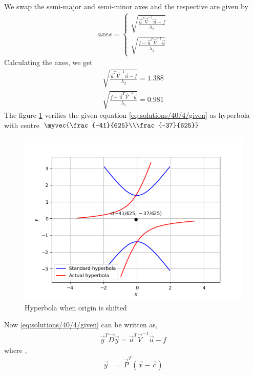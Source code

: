 We swap the semi-major and semi-minor axes and the respective are given by
\begin{align}
axes=
\begin{cases}
\sqrt{\frac{\vec{u}^T\vec{V}^{-1}\vec{u}-f}{\lambda_2}}\\ \sqrt{\frac{f-\vec{u}^T\vec{V}^{-1}\vec{u}}{\lambda_1}}
\end{cases}
\end{align}
Calculating the axes, we get
\begin{align}
\sqrt{\frac{\vec{u}^T\vec{V}^{-1}\vec{u}-f}{\lambda_2}}=1.388\\
\sqrt{\frac{f-\vec{u}^T\vec{V}^{-1}\vec{u}}{\lambda_1}}=0.981
\end{align}
The figure \ref{eq:solutions/40/4/Fig :1} verifies the given equation \eqref{eq:solutions/40/4/given} as hyperbola with centre $\myvec{\frac{-41}{625}\\\frac{-37}{625}}$
\begin{figure}[h]
    \centering
    \includegraphics[width=\columnwidth]{./solutions/40/4/Hyperbola.png}
    \caption{Hyperbola when origin is shifted}
    \label{eq:solutions/40/4/Fig :1}
\end{figure}
\item  Now \eqref{eq:solutions/40/4/given} can be written as,
\begin{align}
    \vec{y}^T\vec{D}\vec{y}=\vec{u}^T\vec{V}^{-1}\vec{u}-f\label{eq:solutions/40/4/fi}
\end{align}
where ,
\begin{align}
    \vec{y}&=\vec{P}^T(\vec{x}-\vec{c})
\end{align}
